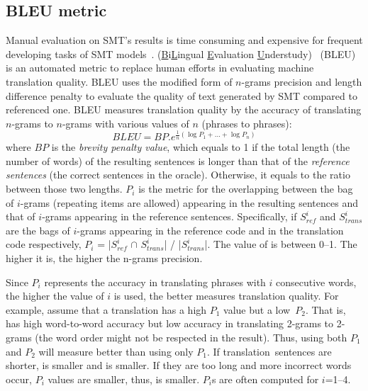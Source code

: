 \subsection{BLEU metric}

Manual evaluation on SMT's results is time consuming and expensive for
frequent developing tasks of SMT models~\cite{Papineni2002}.
%
(\underline{B}i\underline{L}ingual \underline{E}valuation
\underline{U}nderstudy)~\cite{Papineni2002} (BLEU) is an automated
metric to replace human efforts in evaluating machine translation
quality.
BLEU uses the modified form of $n$-grams precision and length
difference penalty to evaluate the quality of text generated by SMT
compared to referenced one.
%
BLEU measures translation quality by the accuracy of translating
$n$-grams to $n$-grams with various values of $n$ (phrases to
phrases):
\[BLEU = BP.{e^{\frac{1}{n}(\log {P_1} + ... + \log {P_n})}}\]
where $BP$ is the {\em brevity penalty value}, which equals to 1 if
the total length (\ie the number of words) of the resulting sentences
is longer than that of the {\em reference sentences} (\ie the correct
sentences in the oracle). Otherwise, it equals to the ratio between
those two lengths. $P_i$ is the metric for the overlapping between
the bag of $i$-grams (repeating items are allowed) appearing in the
resulting sentences and that of $i$-grams appearing in the reference
sentences. Specifically, if $S^{i}_{ref}$ and $S^{i}_{trans}$ are the
bags of $i$-grams appearing in the reference code and in the
translation code respectively, $P_i$ = |$S^{i}_{ref}$ $\cap$
$S^{i}_{trans}$| / |$S^{i}_{trans}$|. The value of  is
between 0--1. The higher it is, the higher the n-grams precision.

Since $P_i$ represents the accuracy in translating phrases
with $i$ consecutive words, the higher the value of $i$ is used, the
better  measures translation quality. For example, assume
that a translation  has a high $P_1$ value but a
low~$P_2$. That is,  has high word-to-word accuracy but low
accuracy in translating 2-grams to 2-grams (\eg the word order might
not be respected in the result). Thus, using both $P_1$ and $P_2$ will
measure  better than using only $P_1$. If
translation~sen\-tences are shorter,  is smaller and
 is smaller. If they are too long and more incorrect words
occur, $P_i$ values are smaller, thus,  is smaller. $P_i$s
are often computed for $i$=1--4.
